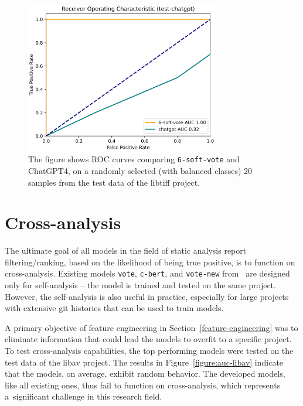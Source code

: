 \begin{figure}[t]
	\centering
	\includegraphics[width=0.75\textwidth]{figures/auc-chatgpt.png}
	\caption{The figure shows ROC curves comparing \texttt{6-soft-vote} and ChatGPT4, on a randomly selected (with balanced classes) 20 samples from the test data of the libtiff project.}
	\label{figure:auc-chatgpt}
\end{figure}

\section{Cross-analysis}
\label{cross-analysis}
The ultimate goal of all models in the field of static analysis report filtering/ranking, based on the likelihood of being true positive, is to function on cross-analysis. Existing models \texttt{vote}, \texttt{c-bert}, and \texttt{vote-new} from~\cite{D2A-zheng2021d2a, pujar2024analyzing} are designed only for self-analysis -- the model is trained and tested on the same project. However, the self-analysis is also useful in practice, especially for large projects with extensive git histories that can be used to train models. 

A primary objective of feature engineering in Section~\ref{feature-engineering} was to eliminate information that could lead the models to overfit to a specific project. To test cross-analysis capabilities, the top performing models were tested on the test data of the libav project. The results in Figure~\ref{figure:auc-libav} indicate that the models, on average, exhibit random behavior. The developed models, like all existing ones, thus fail to function on cross-analysis, which represents a~significant challenge in this research field.

